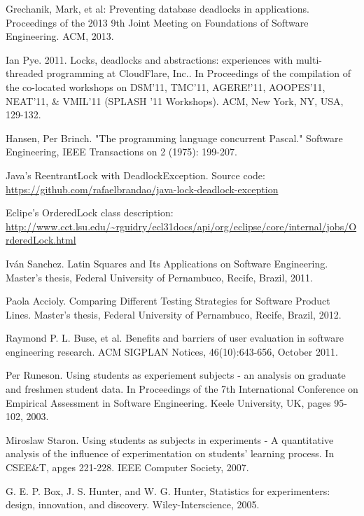 \begin{thebibliography}{4}
 Grechanik, Mark, et al: Preventing database deadlocks in applications.
Proceedings of the 2013 9th Joint Meeting on Foundations of Software Engineering. ACM, 2013.

 Ian Pye. 2011. Locks, deadlocks and abstractions: experiences with multi-threaded programming at CloudFlare, Inc.. In Proceedings of the compilation of the co-located workshops on DSM'11, TMC'11, AGERE!'11, AOOPES'11, NEAT'11, \& VMIL'11 (SPLASH '11 Workshops). ACM, New York, NY, USA, 129-132.

 Hansen, Per Brinch. "The programming language concurrent Pascal." Software Engineering, IEEE Transactions on 2 (1975): 199-207.

 Java's ReentrantLock with DeadlockException. Source code: \url{https://github.com/rafaelbrandao/java-lock-deadlock-exception}

 Eclipe's OrderedLock class description: \url{http://www.cct.lsu.edu/~rguidry/ecl31docs/api/org/eclipse/core/internal/jobs/OrderedLock.html}

 Iván Sanchez. Latin Squares and Its Applications on Software Engineering. Master's thesis, Federal University of Pernambuco, Recife, Brazil, 2011.

 Paola Accioly. Comparing Different Testing Strategies for Software Product Lines. Master's thesis, Federal University of Pernambuco, Recife, Brazil, 2012.

 Raymond P. L. Buse, et al. Benefits and barriers of user evaluation in software engineering research. ACM SIGPLAN Notices, 46(10):643-656, October 2011.

 Per Runeson. Using students as experiement subjects - an analysis on graduate and freshmen student data. In Proceedings of the 7th International Conference on Empirical Assessment in Software Engineering. Keele University, UK, pages 95-102, 2003.

 Miroslaw Staron. Using students as subjects in experiments - A quantitative analysis of the influence of experimentation on students' learning process. In CSEE\&T, apges 221-228. IEEE Computer Society, 2007.

 G. E. P. Box, J. S. Hunter, and W. G. Hunter, Statistics for experimenters: design, innovation, and discovery. Wiley-Interscience, 2005.

\end{thebibliography}